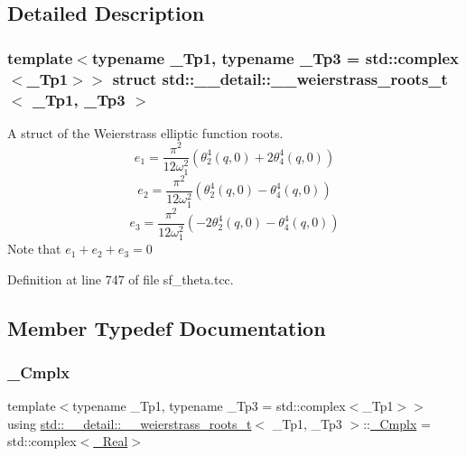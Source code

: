 \subsection{Detailed Description}
\subsubsection*{template$<$typename \+\_\+\+Tp1, typename \+\_\+\+Tp3 = std\+::complex$<$\+\_\+\+Tp1$>$$>$\newline
struct std\+::\+\_\+\+\_\+detail\+::\+\_\+\+\_\+weierstrass\+\_\+roots\+\_\+t$<$ \+\_\+\+Tp1, \+\_\+\+Tp3 $>$}

A struct of the Weierstrass elliptic function roots. \[ e_1 = \frac{\pi^2}{12\omega_1^2}(\theta_2^4(q,0) + 2\theta_4^4(q,0)) \] \[ e_2 = \frac{\pi^2}{12\omega_1^2}(\theta_2^4(q,0) - \theta_4^4(q,0)) \] \[ e_3 = \frac{\pi^2}{12\omega_1^2}(-2\theta_2^4(q,0) - \theta_4^4(q,0)) \] Note that $ e_1 + e_2 + e_3 = 0 $ 

Definition at line 747 of file sf\+\_\+theta.\+tcc.



\subsection{Member Typedef Documentation}
\mbox{\label{structstd_1_1____detail_1_1____weierstrass__roots__t_aac17f2bddcbd8c9ed8cc5ab8c44df622}} 
\subsubsection{\texorpdfstring{\+\_\+\+Cmplx}{\_Cmplx}}
{\footnotesize\ttfamily template$<$typename \+\_\+\+Tp1, typename \+\_\+\+Tp3 = std\+::complex$<$\+\_\+\+Tp1$>$$>$ \\
using \hyperlink{structstd_1_1____detail_1_1____weierstrass__roots__t}{std\+::\+\_\+\+\_\+detail\+::\+\_\+\+\_\+weierstrass\+\_\+roots\+\_\+t}$<$ \+\_\+\+Tp1, \+\_\+\+Tp3 $>$\+::\hyperlink{structstd_1_1____detail_1_1____weierstrass__roots__t_aac17f2bddcbd8c9ed8cc5ab8c44df622}{\+\_\+\+Cmplx} =  std\+::complex$<$\hyperlink{structstd_1_1____detail_1_1____weierstrass__roots__t_a37df115993982e284c018276d175a53c}{\+\_\+\+Real}$>$}



